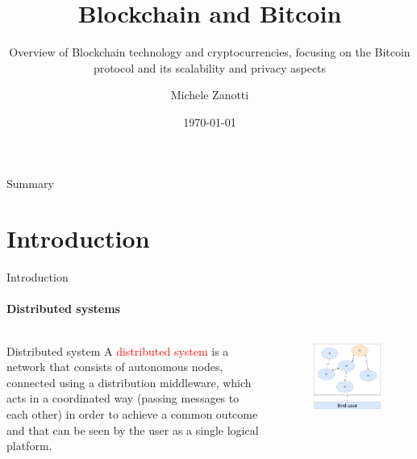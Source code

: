 \documentclass{beamer}
\title{Blockchain and Bitcoin}
\subtitle[]{Overview of Blockchain technology and cryptocurrencies, focusing on
the Bitcoin protocol and its scalability and privacy aspects}
\institute[]{Università degli studi di Brescia}
\author{Michele Zanotti}
\date{\today}
\begin{document}
  \begin{frame}
    \titlepage
  \end{frame}
  \begin{frame}{Summary}
    \tableofcontents
  \end{frame}

  \section{Introduction}
  \begin{frame}{Introduction}
    \framesubtitle{Distributed systems}
    \begin{columns}[onlytextwidth]
       \begin{block}{Distributed system}
        A \textcolor{red}{distributed system} is a network that consists of autonomous nodes,
        connected using a distribution middleware, which acts in a coordinated way
        (passing messages to each other) in order to achieve a common outcome and
        that can be seen by the user as a single logical platform.
      \end{block}

      \begin{figure}[!htb]
        \centering
        \includegraphics[width=0.7\linewidth]{../img/distributed-system.png}
      \end{figure}
    \end{columns}
  \end{frame}
\end{document}
